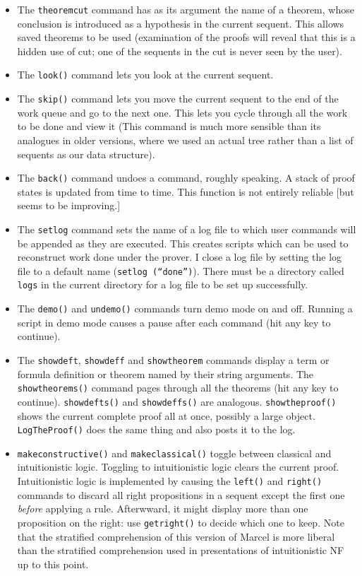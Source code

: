 \documentclass[12pt]{article}
\begin{document}
\begin{itemize}
\item  The {\tt theoremcut} command has as its argument the name of a theorem, whose conclusion is introduced as a hypothesis in the current sequent.  This allows saved theorems to be used (examination of the proofs will reveal that this is a hidden use of cut;  one of the sequents in the cut is never seen by the user).

\item The {\tt look()} command lets you look at the current sequent.

\item The {\tt skip()} command lets you move the current sequent to the end of the work queue and go to the next one.  This lets you cycle through all the work to be done and view it (This command is much more sensible than its analogues in older versions, where we used
an actual tree rather than a list of sequents as our data structure).

\item The {\tt back()} command undoes a command, roughly speaking.  A stack of proof states is updated from time to time.  This function
is not entirely reliable [but seems to be improving.]

\item  The {\tt setlog} command sets the name of a log file to which user commands will be appended as they are executed.
This creates scripts which can be used to reconstruct work done under the prover.  I close a log file by setting the log file to a default name ({\tt setlog (``done'')}).  There must be a directory called {\tt logs} in the current directory for a log file to be set up successfully.

\item The {\tt demo()} and {\tt undemo()} commands turn demo mode on and off.  Running a script in demo mode causes a pause after each command (hit any key to continue).

\item The {\tt showdeft}, {\tt showdeff} and {\tt showtheorem} commands display a term or formula definition or theorem named by their string arguments.
The {\tt showtheorems()} command pages through all the theorems (hit any key to continue).  {\tt showdefts()} and {\tt showdeffs()} are analogous.
{\tt showtheproof()} shows the current complete proof all at once, possibly a large object.  {\tt LogTheProof()} does the same thing and also posts it to the log.

\item {\tt makeconstructive()} and {\tt makeclassical()} toggle between classical and intuitionistic logic.  Toggling to intuitionistic logic clears the current proof.  Intuitionistic logic is implemented by causing the {\tt left()} and {\tt right()} commands to discard all right propositions in a sequent except the first one {\em before\/} applying a rule.  Afterwward, it might display more than one proposition on the right:  use {\tt getright()} to decide which one to keep.  Note that the stratified comprehension of this version of Marcel is more liberal than the stratified comprehension used in presentations of intuitionistic NF up to this point.
\end{itemize}
\end{document}
